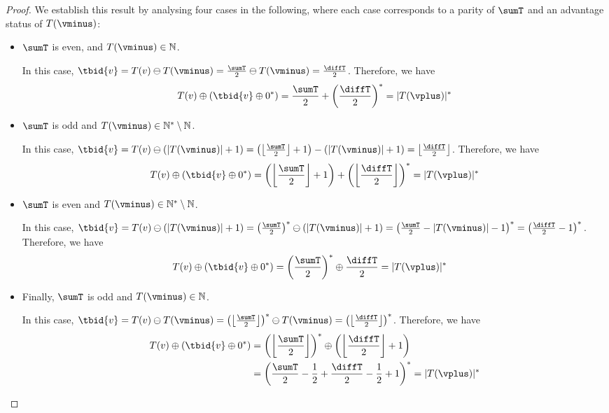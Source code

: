 \documentclass{article}\providecommand{\nequiv}{\not\equiv}\usepackage[a4paper,margin=20mm]{geometry}
\newcommand{\Nat}{\mathbb{N}}
\newcommand{\Natstro}{\mathbb{N}^* \setminus \mathbb{N}}
\newcommand{\succb}[1]{#1 \oplus 0^*\xspace}
\newcommand{\succInt}[1]{\left(#1\right)^*}
\DeclarePairedDelimiter{\adjustfloor}{\lfloor}{\rfloor}
\newcommand{\floor}[1]{\adjustfloor*{#1}}
\newcommand{\adjustbrac}[1]{\left(#1\right)}
\newcommand{\absolut}[1]{|#1|}
\newcommand{\half}[1]{\frac{#1}{2}}
\begin{document}
\begin{proof}
	We establish this result by analysing four cases in the following, where each case corresponds to a parity of \(\sumT\) and an advantage status of \(T(\vminus)\):
	
	\begin{itemize}
		\item \(\sumT\) is even, and \(T(\vminus) \in \Nat\). 
		
		In this case, \(\tbid{v} = T(v) \ominus T(\vminus) = \frac{\sumT}{2} \ominus T(\vminus) = \frac{\diffT}{2}\). 
		Therefore, we have 
		\begin{align*}
			T(v) \oplus (\succb{\tbid{v}}) = \frac{\sumT}{2} +  \succInt{\frac{\diffT}{2}} = \absolut{T(\vplus)}^*
		\end{align*}
	
	\item \(\sumT\) is odd and \(T(\vminus) \in \Natstro\). 
	
	In this case, \(\tbid{v} = T(v) \ominus (\absolut{T(\vminus)} + 1) = \left(\floor{\frac{\sumT}{2}} + 1\right) - (\absolut{T(\vminus)} + 1) = \floor{\frac{\diffT}{2}}\).
	Therefore, we have
	\begin{align*}
		T(v) \oplus (\succb{\tbid{v}}) = \adjustbrac{\floor{\frac{\sumT}{2}} +1} + \adjustbrac{\floor{\frac{\diffT}{2}}}^* = \absolut{T(\vplus)}^* 
	\end{align*} 

	\item \(\sumT\) is even and \(T(\vminus) \in \Natstro\). 
	
	In this case, \(\tbid{v} = T(v) \ominus (\absolut{T(\vminus)} + 1) = \succInt{\frac{\sumT}{2}} \ominus (\absolut{T(\vminus)} + 1) \linebreak = \succInt{\frac{\sumT}{2} - \absolut{T(\vminus)} - 1} = \succInt{\frac{\diffT}{2} - 1}\). 
	Therefore, we have 
	\begin{align*}
		T(v) \oplus (\succb{\tbid{v}}) &= \succInt{\frac{\sumT}{2}} \oplus \frac{\diffT}{2} = \absolut{T(\vplus)}^*
	\end{align*}

	\item Finally, \(\sumT\) is odd and \(T(\vminus) \in \Nat\). 
	
	In this case, \(\tbid{v} = T(v) \ominus T(\vminus) = \succInt{\floor{\frac{\sumT}{2}}} \ominus T(\vminus) = \succInt{\floor{\frac{\diffT}{2}}}\). 
	Therefore, we have
	\begin{align*}
		T(v) \oplus (\succb{\tbid{v}}) &= \succInt{\floor{\frac{\sumT}{2}}} \oplus \adjustbrac{\floor{\frac{\diffT}{2}} + 1} \\
		&= \succInt{\frac{\sumT}{2} - \half{1} + \half{\diffT} - \half{1} + 1} = \absolut{T(\vplus)}^*
	\end{align*}
	\end{itemize}
\end{proof}
\end{document}
